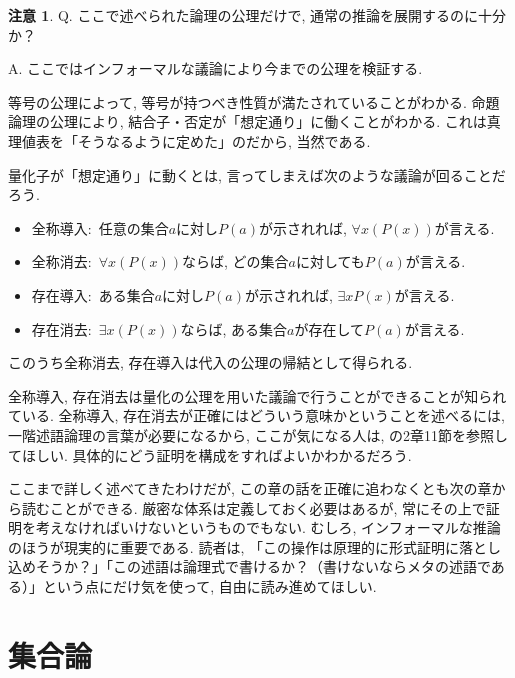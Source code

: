 \documentclass[a4paper, twoside]{bxjsarticle}
\theoremstyle{definition}
\newtheorem{rem}[thm]{注意}
\begin{document}
        \begin{rem}
        Q. ここで述べられた論理の公理だけで, 通常の推論を展開するのに十分か？
        
        A. ここではインフォーマルな議論により今までの公理を検証する.
        
        等号の公理によって, 等号が持つべき性質が満たされていることがわかる. 命題論理の公理により, 結合子・否定が「想定通り」に働くことがわかる. これは真理値表を「そうなるように定めた」のだから, 当然である. 
        
        量化子が「想定通り」に動くとは, 言ってしまえば次のような議論が回ることだろう. 
        \begin{itemize}
            \item 全称導入$\colon$ 任意の集合$a$に対し$P(a)$が示されれば, $\forall x (P(x))$が言える.
            \item 全称消去$\colon$ $\forall x (P(x))$ならば, どの集合$a$に対しても$P(a)$が言える.
            \item 存在導入$\colon$ ある集合$a$に対し$P(a)$が示されれば, $\exists x P(x)$が言える.
            \item 存在消去$\colon$ $\exists x (P(x))$ならば, ある集合$a$が存在して$P(a)$が言える.
        \end{itemize}
        このうち全称消去, 存在導入は代入の公理の帰結として得られる. 
        
        全称導入, 存在消去は量化の公理を用いた議論で行うことができることが知られている. 
        全称導入, 存在消去が正確にはどういう意味かということを述べるには, 一階述語論理の言葉が必要になるから, ここが気になる人は, \cite{kunenfound}の2章11節を参照してほしい. 具体的にどう証明を構成をすればよいかわかるだろう.
    \end{rem}
    
        ここまで詳しく述べてきたわけだが, この章の話を正確に追わなくとも次の章から読むことができる. 厳密な体系は定義しておく必要はあるが, 常にその上で証明を考えなければいけないというものでもない. むしろ, インフォーマルな推論のほうが現実的に重要である. 読者は, 「この操作は原理的に形式証明に落とし込めそうか？」「この述語は論理式で書けるか？（書けないならメタの述語である）」という点にだけ気を使って, 自由に読み進めてほしい.

    \cleardoublepage

    \section{集合論}
\end{document}
